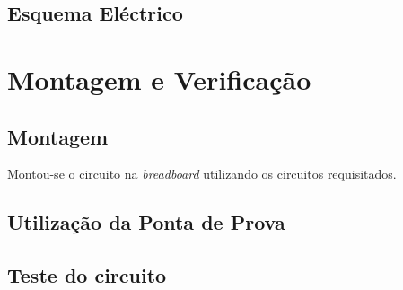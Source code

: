 \documentclass[a4paper,12pt]{article}
\begin{document}
\subsection{Esquema Eléctrico}

\section{Montagem e Verificação}
\subsection{Montagem}
Montou-se o circuito na {\it breadboard} utilizando os circuitos requisitados.
\subsection{Utilização da Ponta de Prova}
\vspace*{7\baselineskip}
\subsection{Teste do circuito}
\vspace*{4\baselineskip}
\end{document}
